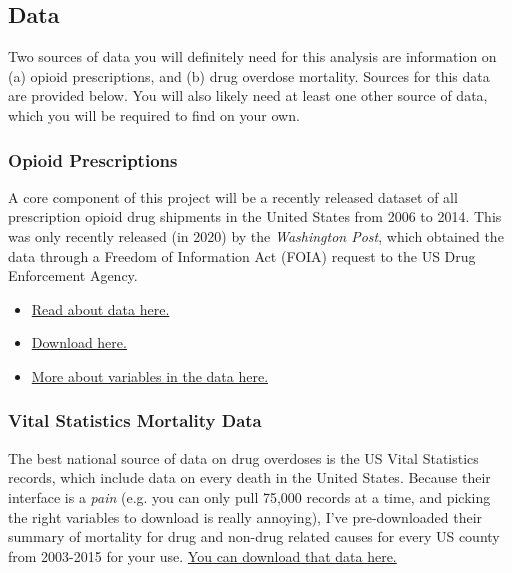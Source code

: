 \documentclass[12pt]{article}
\begin{document}
\subsection*{Data}

Two sources of data you will definitely need for this analysis are information on (a) opioid prescriptions, and (b) drug overdose mortality. Sources for this data are provided below. You will also likely need at least one other source of data, which you will be required to find on your own.

\subsubsection*{Opioid Prescriptions}

A core component of this project will be a recently released dataset of all prescription opioid drug shipments in the United States from 2006 to 2014. This was only recently released (in 2020) by the \emph{Washington Post}, which obtained the data through a Freedom of Information Act (FOIA) request to the US Drug Enforcement Agency.

\begin{itemize}
  \item \href{https://www.washingtonpost.com/graphics/2019/investigations/dea-pain-pill-database/}{Read about data here.}
  \item \href{https://www.washingtonpost.com/national/2019/07/18/how-download-use-dea-pain-pills-database/?arc404=true}{Download here.}
  \item \href{https://github.com/wpinvestigative/arcos-api/blob/master/data/data_dictionary.csv}{More about variables in the data here.}
\end{itemize}

\subsubsection*{Vital Statistics Mortality Data}

The best national source of data on drug overdoses is the US Vital Statistics records, which include data on every death in the United States. Because their interface is a \emph{pain} (e.g. you can only pull 75,000 records at a time, and picking the right variables to download is really annoying), I've pre-downloaded their summary of mortality for drug and non-drug related causes for every US county from 2003-2015 for your use. \href{https://www.dropbox.com/s/kad4dwebr88l3ud/US_VitalStatistics.zip?dl=0}{You can download that data here.}
\end{document}
